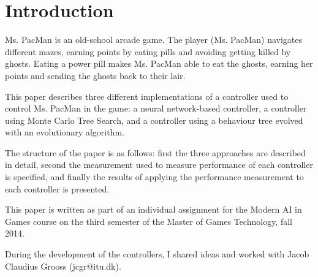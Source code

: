 \section{Introduction}
Ms. PacMan is an old-school arcade game. The player (Ms. PacMan) navigates different mazes, earning points by eating pills and avoiding getting killed by ghosts. Eating a power pill makes Ms. PacMan able to eat the ghosts, earning her points and sending the ghosts back to their lair.

This paper describes three different implementations of a controller used to control Ms. PacMan in the game: a neural network-based controller, a controller using Monte Carlo Tree Search, and a controller using a behaviour tree evolved with an evolutionary algorithm.

The structure of the paper is as follows: first the three approaches are described in detail, second the measurement used to measure performance of each controller is specified, and finally the results of applying the performance measurement to each controller is presented.

This paper is written as part of an individual assignment for the Modern AI in Games course on the third semester of the Master of Games Technology, fall 2014.

During the development of the controllers, I shared ideas and worked with Jacob Claudius Grooss (jcgr@itu.dk).